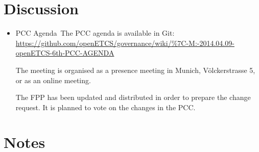 \documentclass[a4paper, 11pt]{article}
\begin{document}
\section{Discussion}
\begin{itemize}

\item PCC Agenda\
The PCC agenda is available in Git:
 \url{https://github.com/openETCS/governance/wiki/%7C-M:-2014.04.09-openETCS-6th-PCC-AGENDA}
 
The meeting is organised as a presence meeting in Munich, V\"olckerstrasse 5, or as an online meeting.

The FPP has been updated and distributed in order to prepare the change request. It is planned to vote on the changes in the PCC.

\end{itemize}

\section{Notes}
\end{document}
